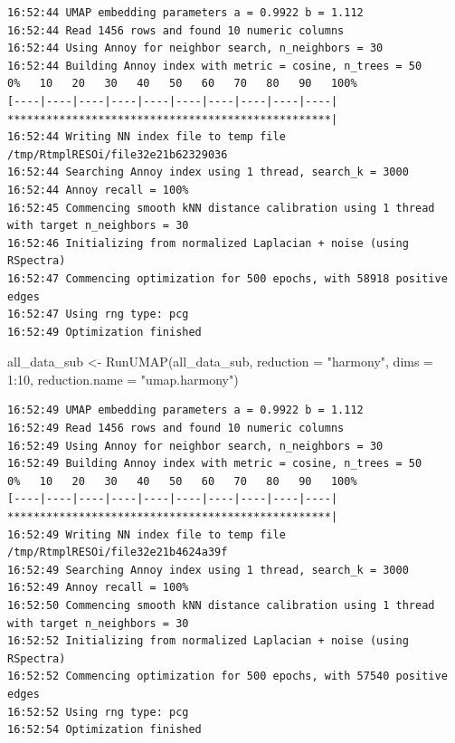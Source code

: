 \documentclass[
  letterpaper,
  DIV=11,
  numbers=noendperiod]{scrreprt}
\newenvironment{Shaded}{\begin{snugshade}}{\end{snugshade}}
\newcommand{\AttributeTok}[1]{\textcolor[rgb]{0.40,0.45,0.13}{#1}}
\newcommand{\DecValTok}[1]{\textcolor[rgb]{0.68,0.00,0.00}{#1}}
\newcommand{\FunctionTok}[1]{\textcolor[rgb]{0.28,0.35,0.67}{#1}}
\newcommand{\NormalTok}[1]{\textcolor[rgb]{0.00,0.23,0.31}{#1}}
\newcommand{\OtherTok}[1]{\textcolor[rgb]{0.00,0.23,0.31}{#1}}
\newcommand{\SpecialCharTok}[1]{\textcolor[rgb]{0.37,0.37,0.37}{#1}}
\newcommand{\StringTok}[1]{\textcolor[rgb]{0.13,0.47,0.30}{#1}}
\begin{document}
\begin{verbatim}
16:52:44 UMAP embedding parameters a = 0.9922 b = 1.112
16:52:44 Read 1456 rows and found 10 numeric columns
16:52:44 Using Annoy for neighbor search, n_neighbors = 30
16:52:44 Building Annoy index with metric = cosine, n_trees = 50
0%   10   20   30   40   50   60   70   80   90   100%
[----|----|----|----|----|----|----|----|----|----|
**************************************************|
16:52:44 Writing NN index file to temp file /tmp/RtmplRESOi/file32e21b62329036
16:52:44 Searching Annoy index using 1 thread, search_k = 3000
16:52:44 Annoy recall = 100%
16:52:45 Commencing smooth kNN distance calibration using 1 thread with target n_neighbors = 30
16:52:46 Initializing from normalized Laplacian + noise (using RSpectra)
16:52:47 Commencing optimization for 500 epochs, with 58918 positive edges
16:52:47 Using rng type: pcg
16:52:49 Optimization finished
\end{verbatim}

\begin{Shaded}
\begin{Highlighting}[]
\NormalTok{all\_data\_sub }\OtherTok{\textless{}{-}} \FunctionTok{RunUMAP}\NormalTok{(all\_data\_sub, }\AttributeTok{reduction =} \StringTok{"harmony"}\NormalTok{, }\AttributeTok{dims =} \DecValTok{1}\SpecialCharTok{:}\DecValTok{10}\NormalTok{, }\AttributeTok{reduction.name =} \StringTok{"umap.harmony"}\NormalTok{)}
\end{Highlighting}
\end{Shaded}

\begin{verbatim}
16:52:49 UMAP embedding parameters a = 0.9922 b = 1.112
16:52:49 Read 1456 rows and found 10 numeric columns
16:52:49 Using Annoy for neighbor search, n_neighbors = 30
16:52:49 Building Annoy index with metric = cosine, n_trees = 50
0%   10   20   30   40   50   60   70   80   90   100%
[----|----|----|----|----|----|----|----|----|----|
**************************************************|
16:52:49 Writing NN index file to temp file /tmp/RtmplRESOi/file32e21b4624a39f
16:52:49 Searching Annoy index using 1 thread, search_k = 3000
16:52:49 Annoy recall = 100%
16:52:50 Commencing smooth kNN distance calibration using 1 thread with target n_neighbors = 30
16:52:52 Initializing from normalized Laplacian + noise (using RSpectra)
16:52:52 Commencing optimization for 500 epochs, with 57540 positive edges
16:52:52 Using rng type: pcg
16:52:54 Optimization finished
\end{verbatim}
\end{document}
